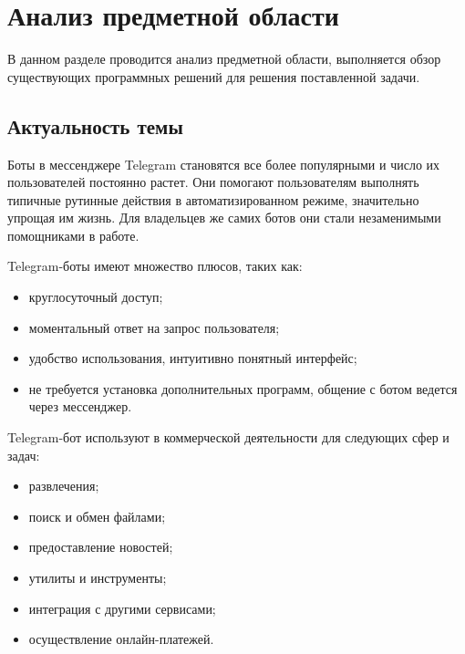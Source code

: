 
\section{Анализ предметной области}

В данном разделе проводится анализ предметной области,
выполняется обзор существующих программных решений для решения поставленной задачи.

\subsection{Актуальность темы}

Боты в мессенджере Telegram становятся все более популярными и
число их пользователей постоянно растет. Они помогают пользователям
выполнять типичные рутинные действия в автоматизированном режиме,
значительно упрощая им жизнь. Для владельцев же самих ботов они стали
незаменимыми помощниками в работе.

Telegram-боты имеют множество плюсов, таких как:
\begin{itemize}
	\item круглосуточный доступ;
	\item моментальный ответ на запрос пользователя;
	\item удобство использования, интуитивно понятный интерфейс;
	\item не требуется установка дополнительных программ,
	      общение с ботом ведется через мессенджер.
\end{itemize}

Telegram-бот используют в коммерческой деятельности для следующих сфер и задач:
\begin{itemize}
	\item развлечения;
	\item поиск и обмен файлами;
	\item предоставление новостей;
	\item утилиты и инструменты;
	\item интеграция с другими сервисами;
	\item осуществление онлайн-платежей.
\end{itemize}

